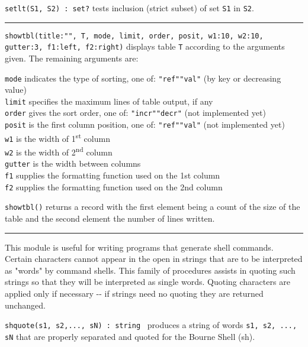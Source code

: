\texttt{setlt(S1, S2) : set?} tests inclusion (strict subset) of set
\texttt{S1} in \texttt{S2}. 


\vspace{0.25cm}\hrule{}

\texttt{showtbl(title:"", T, mode, limit,
order, posit, w1:10, w2:10, gutter:3, f1:left, f2:right)} displays
table \texttt{T} according to the arguments given. The remaining arguments are:

\texttt{mode} indicates the type of sorting, one of:
\texttt{"ref"{\textbar}"val"}
(by key or decreasing value)\\
\texttt{limit} specifies the maximum lines of table output, if
any\\
\texttt{order} gives the sort order, one of:
\texttt{"incr"{\textbar}"decr"}
(not implemented yet)\\
\texttt{posit} is the first column position, one of:
\texttt{"ref"{\textbar}"val"}
(not implemented yet)\\
\texttt{w1} is the width of 1\textsuperscript{st} column\\
\texttt{w2} is the width of 2\textsuperscript{nd} column\\
\texttt{gutter} is the width between columns\\
\texttt{f1} supplies the formatting function used on the 1st
column\\
\texttt{f2} supplies the formatting function used on the 2nd column

\noindent \texttt{showtbl()} returns a record with the first element being a count
of the size of the table and the second element the number of lines
written. 

\vspace{0.25cm}\hrule{}

This module is useful for writing programs that generate
shell commands. Certain characters cannot appear
in the open in strings that are to be interpreted as
"words" by command shells. This family of
procedures assists in quoting such strings so that they will be
interpreted as single words. Quoting characters are applied only if
necessary -{}- if strings need no quoting they are returned unchanged.


\texttt{shquote(s1, s2,..., sN) : string} \ produces a string of words
\texttt{s1, s2, ..., sN} that are properly separated and quoted for the
Bourne Shell (sh).

